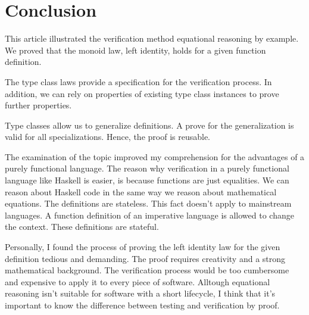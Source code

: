 
\section{Conclusion}

This article illustrated the verification method equational reasoning by example. We proved that the monoid law, left identity, holds for a given function definition. 

The type class laws provide a specification for the verification process. In addition, we can rely on properties of existing type class instances to prove further properties.

Type classes allow us to generalize definitions. A prove for the generalization is valid for all specializations. Hence, the proof is reusable.

The examination of the topic improved my comprehension for the advantages of a purely functional language. The reason why verification in a purely functional language like Haskell is easier, is because functions are just equalities. We can reason about Haskell code in the same way we reason about mathematical equations. The definitions are stateless. This fact doesn't apply to mainstream languages. A function definition of an imperative language is allowed to change the context. These definitions are stateful.

Personally, I found the process of proving the left identity law for the given definition tedious and demanding. The proof requires creativity and a strong mathematical background. The verification process would be too cumbersome and expensive to apply it to every piece of software. Alltough equational reasoning  isn't suitable for software with a short lifecycle, I think that it's important to know the difference between testing and verification by proof.
